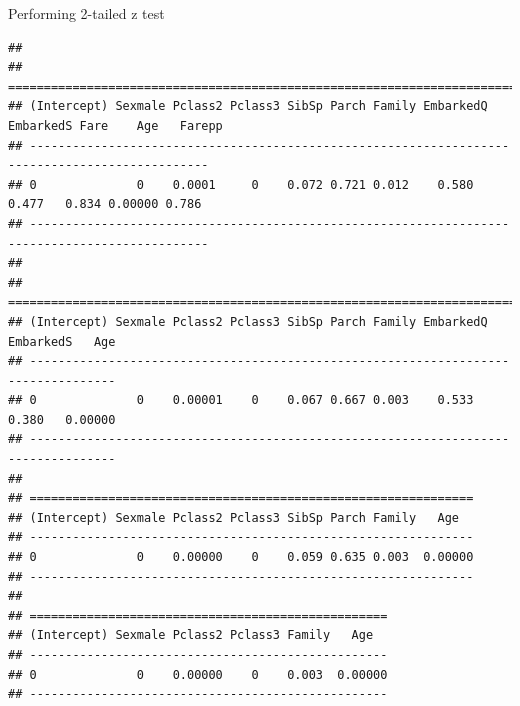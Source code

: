 \documentclass[
]{article}
\begin{document}
Performing 2-tailed z test

\begin{verbatim}
## 
## ===============================================================================================
## (Intercept) Sexmale Pclass2 Pclass3 SibSp Parch Family EmbarkedQ EmbarkedS Fare    Age   Farepp
## -----------------------------------------------------------------------------------------------
## 0              0    0.0001     0    0.072 0.721 0.012    0.580     0.477   0.834 0.00000 0.786 
## -----------------------------------------------------------------------------------------------
## 
## ==================================================================================
## (Intercept) Sexmale Pclass2 Pclass3 SibSp Parch Family EmbarkedQ EmbarkedS   Age  
## ----------------------------------------------------------------------------------
## 0              0    0.00001    0    0.067 0.667 0.003    0.533     0.380   0.00000
## ----------------------------------------------------------------------------------
## 
## ==============================================================
## (Intercept) Sexmale Pclass2 Pclass3 SibSp Parch Family   Age  
## --------------------------------------------------------------
## 0              0    0.00000    0    0.059 0.635 0.003  0.00000
## --------------------------------------------------------------
## 
## ==================================================
## (Intercept) Sexmale Pclass2 Pclass3 Family   Age  
## --------------------------------------------------
## 0              0    0.00000    0    0.003  0.00000
## --------------------------------------------------
\end{verbatim}
\end{document}

